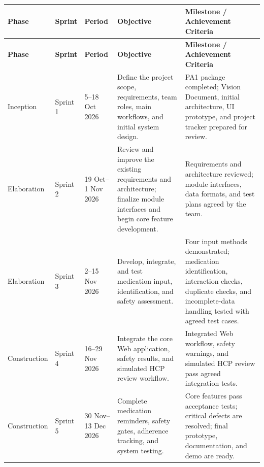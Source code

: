 \begin{longtable}{|
    L{0.13\textwidth}|
    L{0.13\textwidth}|
    L{0.17\textwidth}|
    L{0.23\textwidth}|
    L{0.24\textwidth}|
}
\hline

\textbf{Phase} &
\textbf{Sprint} &
\textbf{Period} &
\textbf{Objective} &
\textbf{Milestone / Achievement Criteria}
\\ \hline

\endfirsthead

\hline
\textbf{Phase} &
\textbf{Sprint} &
\textbf{Period} &
\textbf{Objective} &
\textbf{Milestone / Achievement Criteria}
\\ \hline

\endhead

Inception
& Sprint 1
& 5--18 Oct 2026
& Define the project scope, requirements,
team roles, main workflows, and initial system design.
& PA1 package completed; Vision Document,
initial architecture, UI prototype,
and project tracker prepared for review.
\\ \hline

Elaboration
& Sprint 2
& 19 Oct--1 Nov 2026
& Review and improve the existing requirements
and architecture; finalize module interfaces
and begin core feature development.
& Requirements and architecture reviewed;
module interfaces, data formats,
and test plans agreed by the team.
\\ \hline

Elaboration
& Sprint 3
& 2--15 Nov 2026
& Develop, integrate, and test medication input,
identification, and safety assessment.
& Four input methods demonstrated;
medication identification, interaction checks,
duplicate checks, and incomplete-data handling
tested with agreed test cases.
\\ \hline

Construction
& Sprint 4
& 16--29 Nov 2026
& Integrate the core Web application,
safety results, and simulated HCP review workflow.
& Integrated Web workflow, safety warnings,
and simulated HCP review pass agreed
integration tests.
\\ \hline

Construction
& Sprint 5
& 30 Nov--13 Dec 2026
& Complete medication reminders,
safety gates, adherence tracking,
and system testing.
& Core features pass acceptance tests;
critical defects are resolved;
final prototype, documentation,
and demo are ready.
\\ \hline

\end{longtable}



